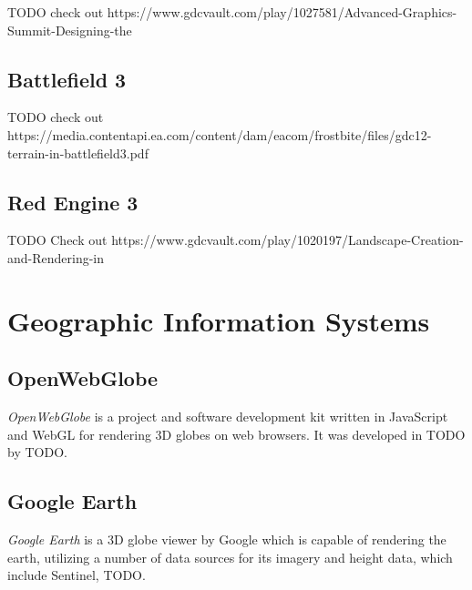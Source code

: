 TODO check out
https://www.gdcvault.com/play/1027581/Advanced-Graphics-Summit-Designing-the

\subsection{Battlefield 3}
TODO check out
https://media.contentapi.ea.com/content/dam/eacom/frostbite/files/gdc12-terrain-in-battlefield3.pdf

\subsection{Red Engine 3}
TODO Check out https://www.gdcvault.com/play/1020197/Landscape-Creation-and-Rendering-in

\section{Geographic Information Systems}

\subsection{OpenWebGlobe}
\textit{OpenWebGlobe} is a project and software development kit written in JavaScript and 
WebGL for rendering 3D globes on web browsers. 
It was developed in TODO by TODO. 

\subsection{Google Earth}
\textit{Google Earth} is a 3D globe viewer by Google which is capable of rendering the earth, utilizing a number of data sources for its imagery and height data,
which include Sentinel, TODO.
